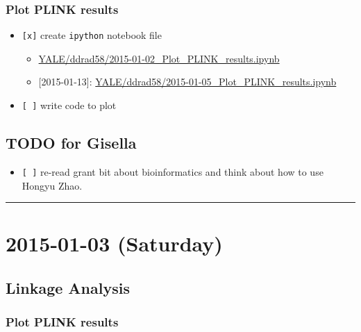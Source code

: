 \documentclass[letterpaper]{scrartcl}
\begin{document}
\subsubsection{Plot PLINK results}\label{plot-plink-results}

\begin{itemize}
\itemsep1pt\parskip0pt
\item
  \texttt{{[}x{]}} create \texttt{ipython} notebook file

  \begin{itemize}
  \itemsep1pt\parskip0pt
  \item
    \href{http://nbviewer.ipython.org/github/xguse/ipy_notebooks/blob/master/YALE/ddrad58/2015-01-02_Plot_PLINK_results.ipynb}{YALE/ddrad58/2015-01-02\_Plot\_PLINK\_results.ipynb}
  \item
    {[}2015-01-13{]}:
    \href{http://nbviewer.ipython.org/github/xguse/ipy_notebooks/blob/master/YALE/ddrad58/2015-01-05_Plot_PLINK_results.ipynb}{YALE/ddrad58/2015-01-05\_Plot\_PLINK\_results.ipynb}
  \end{itemize}
\item
  \texttt{{[} {]}} write code to plot
\end{itemize}

\subsection{TODO for Gisella}\label{todo-for-gisella}

\begin{itemize}
\itemsep1pt\parskip0pt
\item
  \texttt{{[} {]}} re-read grant bit about bioinformatics and think
  about how to use Hongyu Zhao.
\end{itemize}

\begin{center}\rule{0.5\linewidth}{\linethickness}\end{center}

\section{2015-01-03 (Saturday)}\label{saturday}

\subsection{Linkage Analysis}\label{linkage-analysis-1}

\subsubsection{Plot PLINK results}\label{plot-plink-results-1}
\end{document}
